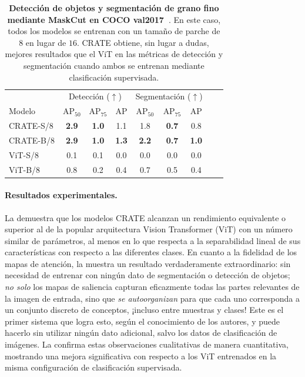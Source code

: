 \documentclass[../../book-main_es.tex]{subfiles}
\begin{document}
\begin{table}
\caption{\small \textbf{Detección de objetos y segmentación de grano fino
    mediante MaskCut en COCO {val2017}~\citep{lin2014microsoft}}.
    En este caso, todos los modelos se entrenan con un tamaño de parche de \(8\) en lugar de \(16\).
    CRATE obtiene, sin lugar a dudas, mejores resultados que el ViT en las métricas de detección y
segmentación cuando ambos se entrenan mediante clasificación supervisada.}
\centering
\begin{tabular}{@{}lcccccccc@{}}
    \toprule
    &  \multicolumn{3}{c}{Detección (\(\uparrow\))} &
    \multicolumn{3}{c}{Segmentación (\(\uparrow\))} \\
    Modelo & AP$_{50}$ & AP$_{75}$ & AP & AP$_{50}$ & AP$_{75}$ & AP  \\
    \midrule
    CRATE-S/8 & \textbf{2.9} & \textbf{1.0} & 1.1 & 1.8 & \textbf{0.7} & 0.8 \\
    CRATE-B/8 & \textbf{2.9} & \textbf{1.0} & \textbf{1.3} &
    \textbf{2.2} & \textbf{0.7} & \textbf{1.0} \\
    ViT-S/8 & 0.1& 0.1 & 0.0 & 0.0 & 0.0 & 0.0 \\
    ViT-B/8 & 0.8 & 0.2 & 0.4 & 0.7 & 0.5 & 0.4 \\
    \bottomrule
\end{tabular}
\label{tab:crate_detection_segmentation}
\end{table}

\paragraph{Resultados experimentales.}

La  demuestra que
los modelos CRATE alcanzan un rendimiento equivalente o superior al de la popular
arquitectura Vision Transformer (ViT) con un número similar de parámetros, al
menos en lo que respecta a la separabilidad lineal de sus características
con respecto a las diferentes clases. En cuanto a la fidelidad de los mapas de atención,
la  muestra un resultado verdaderamente extraordinario:
sin necesidad de entrenar con ningún dato de segmentación o detección de objetos;
\textit{no solo} los mapas de saliencia capturan eficazmente
todas las partes relevantes de la imagen de entrada, sino que
\textit{se autoorganizan} para que cada uno corresponda a un conjunto discreto de 
conceptos, ¡incluso entre muestras y clases! Este es el primer sistema
que logra esto, según el conocimiento de los autores, y puede hacerlo sin
utilizar ningún dato adicional, salvo los datos de clasificación de imágenes.
La  confirma estas observaciones cualitativas
de manera cuantitativa, mostrando una mejora significativa con respecto a los ViT
entrenados en la misma configuración de clasificación supervisada.
\end{document}
